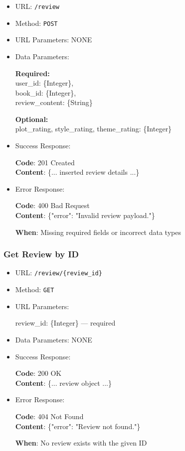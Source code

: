 \begin{itemize}
    \item URL: \texttt{/review}
    \item Method: \texttt{POST}
    \item URL Parameters: NONE
    \item Data Parameters:

    \textbf{Required:} \\
    user\_id: \{Integer\}, \\
    book\_id: \{Integer\}, \\
    review\_content: \{String\}

    \textbf{Optional:} \\
    plot\_rating, style\_rating, theme\_rating: \{Integer\}

    \item Success Response: \newline

    \textbf{Code}: 201 Created \\
    \textbf{Content}: \{... inserted review details ...\}

    \item Error Response: \newline

    \textbf{Code}: 400 Bad Request \\
    \textbf{Content}: \{"error": "Invalid review payload."\}

    \textbf{When}: Missing required fields or incorrect data types
\end{itemize}

\subsubsection*{Get Review by ID}

\begin{itemize}
    \item URL: \texttt{/review/\{review\_id\}}
    \item Method: \texttt{GET}
    \item URL Parameters:

    review\_id: \{Integer\} — required

    \item Data Parameters: NONE

    \item Success Response: \newline

    \textbf{Code}: 200 OK \\
    \textbf{Content}: \{... review object ...\}

    \item Error Response: \newline

    \textbf{Code}: 404 Not Found \\
    \textbf{Content}: \{"error": "Review not found."\}

    \textbf{When}: No review exists with the given ID
\end{itemize}

